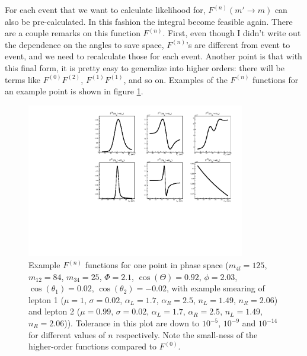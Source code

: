 \documentclass{cmspaper}
\begin{document}
For each event that we want to calculate likelihood for, $F^{(n)} (m' \rightarrow m)$ can also be pre-calculated.
In this fashion the integral become feasible again.  There are a couple remarks on this function $F^{(n)}$.
First, even though I didn't write out the dependence on the angles to save space, $F^{(n)}$'s are different
from event to event, and we need to recalculate those for each event.  Another point is that with this
final form, it is pretty easy to generalize into higher orders: there will be terms like $F^{(0)}F^{(2)}$,
$F^{(1)}F^{(1)}$, and so on.  Examples of the $F^{(n)}$ functions for an example point is shown in figure
\ref{fig:ExampleFFunctions}.

\begin{figure}[htb!]
  \begin{center}
    \includegraphics[width=0.85\textwidth]{figures/ExampleFFunction.pdf}
    \caption{Example $F^{(n)}$ functions for one point in phase space ($m_{4l} = 125$, $m_{12} = 84$, $m_{34} = 25$,
    $\Phi = 2.1$, $\cos(\Theta) = 0.92$, $\phi = 2.03$, $\cos(\theta_1) = 0.02$, $\cos(\theta_2) = -0.02$,
    with example smearing of lepton 1 ($\mu = 1$, $\sigma = 0.02$, $\alpha_L = 1.7$, $\alpha_R = 2.5$,
    $n_L = 1.49$, $n_R = 2.06$) and lepton 2 ($\mu = 0.99$, $\sigma = 0.02$, $\alpha_L = 1.7$, $\alpha_R = 2.5$,
    $n_L = 1.49$, $n_R = 2.06$)).  Tolerance in this plot are down to $10^{-5}$, $10^{-9}$ and $10^{-14}$ for different
    values of $n$ respectively.  Note the small-ness of the higher-order functions compared to $F^{(0)}$.}
    \label{fig:ExampleFFunctions}
  \end{center}
\end{figure}
\end{document}
